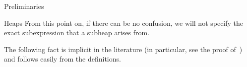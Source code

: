 \documentclass[11pt]{amsart}
\newtheorem{lemma}[theorem]{Lemma}
\newtheorem{proposition}[theorem]{Proposition}
\theoremstyle{definition}
\numberwithin{equation}{section}
\newcommand{\C}{\widetilde{C}}
\renewcommand{\(}{\left(}
\renewcommand{\)}{\right)}
\DeclareMathOperator{\FC}{FC}
\newcommand\xxaxis{0}
\newcommand\yyaxis{90}
\newcommand\heapblank[2]{\fill[fill=white, dotted, draw=black, line width=1.1pt, rounded corners, shift={(\xxaxis:#1)},shift={(\yyaxis:#2)}] (-1,-0.5) rectangle (1,0.5);}
\begin{document}
\begin{section}{Preliminaries}
\begin{subsection}{Heaps}
From this point on, if there can be no confusion, we will not specify the exact subexpression that a subheap arises from.

The following fact is implicit in the literature (in particular, see the proof of~\cite[Proposition 3.3]{Stembridge1996}) and follows easily from the definitions.





\end{subsection}
\end{section}
\end{document}
